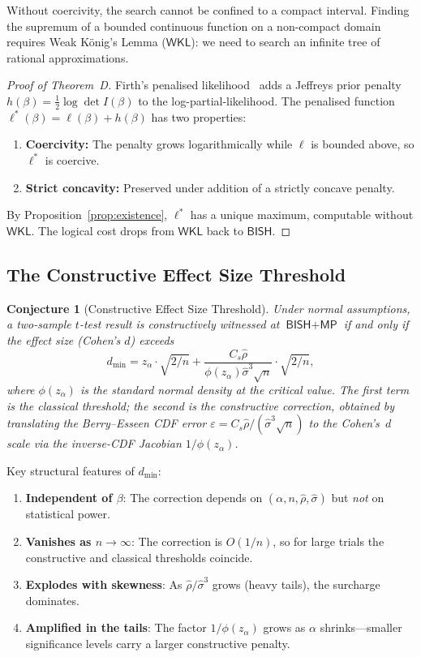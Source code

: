 \documentclass[11pt,a4paper]{article}
\theoremstyle{plain}
\newtheorem{conjecture}[theorem]{Conjecture}
\theoremstyle{definition}
\newcommand{\BISH}{\textsf{BISH}}
\newcommand{\WKL}{\textsf{WKL}}
\newcommand{\MP}{\textsf{MP}}
\begin{document}
Without coercivity, the search cannot be confined to a compact interval.  Finding the supremum of a bounded continuous function on a non-compact domain requires Weak K\"onig's Lemma ($\WKL$): we need to search an infinite tree of rational approximations.

\begin{proof}[Proof of Theorem~D]
Firth's penalised likelihood~\cite{firth1993} adds a Jeffreys prior penalty $h(\beta) = \tfrac{1}{2}\log\det I(\beta)$ to the log-partial-likelihood.  The penalised function $\ell^*(\beta) = \ell(\beta) + h(\beta)$ has two properties:
\begin{enumerate}[nosep]
\item \textbf{Coercivity:} The penalty grows logarithmically while $\ell$ is bounded above, so $\ell^*$ is coercive.
\item \textbf{Strict concavity:} Preserved under addition of a strictly concave penalty.
\end{enumerate}
By Proposition~\ref{prop:existence}, $\ell^*$ has a unique maximum, computable without $\WKL$.  The logical cost drops from $\WKL$ back to $\BISH$.
\end{proof}

\subsection{The Constructive Effect Size Threshold}

\begin{conjecture}[Constructive Effect Size Threshold]\label{conj:dmin}
Under normal assumptions, a two-sample $t$-test result is constructively witnessed at $\BISH + \MP$ if and only if the effect size (Cohen's $d$) exceeds
\[
  d_{\min} = z_\alpha \cdot \sqrt{2/n} + \frac{C_s \hat\rho}{\phi(z_\alpha) \hat\sigma^3 \sqrt{n}} \cdot \sqrt{2/n},
\]
where $\phi(z_\alpha)$ is the standard normal density at the critical value.  The first term is the classical threshold; the second is the \emph{constructive correction}, obtained by translating the Berry--Esseen CDF error $\varepsilon = C_s \hat\rho/(\hat\sigma^3\sqrt{n})$ to the Cohen's~$d$ scale via the inverse-CDF Jacobian $1/\phi(z_\alpha)$.
\end{conjecture}

\noindent Key structural features of $d_{\min}$:
\begin{enumerate}[nosep]
\item \textbf{Independent of $\beta$}: The correction depends on $(\alpha, n, \hat\rho, \hat\sigma)$ but \emph{not} on statistical power.
\item \textbf{Vanishes as $n \to \infty$}: The correction is $O(1/n)$, so for large trials the constructive and classical thresholds coincide.
\item \textbf{Explodes with skewness}: As $\hat\rho/\hat\sigma^3$ grows (heavy tails), the surcharge dominates.
\item \textbf{Amplified in the tails}: The factor $1/\phi(z_\alpha)$ grows as $\alpha$ shrinks---smaller significance levels carry a larger constructive penalty.
\end{enumerate}
\end{document}
